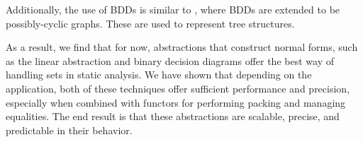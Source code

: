 Additionally, the use of BDDs is similar to \cite{mauborgne:thesis:99}, where BDDs are extended to be possibly-cyclic graphs.  These are used to represent tree structures.


As a result, we find that for now, abstractions that construct normal forms, such as the linear abstraction and binary decision diagrams offer the best way of handling sets in static analysis.  We have shown that depending on the application, both of these techniques offer sufficient performance and precision, especially when combined with functors for performing packing and managing equalities.  The end result is that these abstractions are scalable, precise, and predictable in their behavior.